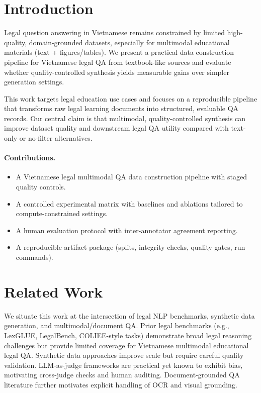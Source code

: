 
\section{Introduction}
\label{sec:intro}
Legal question answering in Vietnamese remains constrained by limited high-quality, domain-grounded datasets, especially for multimodal educational materials (text + figures/tables). We present a practical data construction pipeline for Vietnamese legal QA from textbook-like sources and evaluate whether quality-controlled synthesis yields measurable gains over simpler generation settings.

This work targets legal education use cases and focuses on a reproducible pipeline that transforms raw legal learning documents into structured, evaluable QA records. Our central claim is that multimodal, quality-controlled synthesis can improve dataset quality and downstream legal QA utility compared with text-only or no-filter alternatives.

\paragraph{Contributions.}
\begin{itemize}
\item A Vietnamese legal multimodal QA data construction pipeline with staged quality controls.
\item A controlled experimental matrix with baselines and ablations tailored to compute-constrained settings.
\item A human evaluation protocol with inter-annotator agreement reporting.
\item A reproducible artifact package (splits, integrity checks, quality gates, run commands).
\end{itemize}

\section{Related Work}
\label{sec:related}
We situate this work at the intersection of legal NLP benchmarks, synthetic data generation, and multimodal/document QA. Prior legal benchmarks (e.g., LexGLUE, LegalBench, COLIEE-style tasks) demonstrate broad legal reasoning challenges but provide limited coverage for Vietnamese multimodal educational legal QA. Synthetic data approaches improve scale but require careful quality validation. LLM-as-judge frameworks are practical yet known to exhibit bias, motivating cross-judge checks and human auditing. Document-grounded QA literature further motivates explicit handling of OCR and visual grounding.


